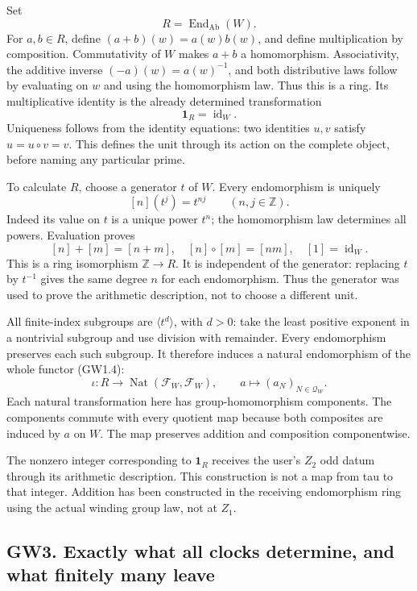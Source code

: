 Set \[
R=\operatorname{End}_{\mathrm{Ab}}(W).
\] For \(a,b\in R\), define \((a+b)(w)=a(w)b(w)\), and define
multiplication by composition. Commutativity of \(W\) makes \(a+b\) a
homomorphism. Associativity, the additive inverse \((-a)(w)=a(w)^{-1}\),
and both distributive laws follow by evaluating on \(w\) and using the
homomorphism law. Thus this is a ring. Its multiplicative identity is
the already determined transformation \[
\mathbf 1_R=\operatorname{id}_W.
\tag{GW2.1}
\] Uniqueness follows from the identity equations: two identities
\(u,v\) satisfy \(u=u\circ v=v\). This defines the unit through its
action on the complete object, before naming any particular prime.

To calculate \(R\), choose a generator \(t\) of \(W\). Every
endomorphism is uniquely \[
[n](t^j)=t^{nj}\qquad(n,j\in\mathbb Z).
\] Indeed its value on \(t\) is a unique power \(t^n\); the homomorphism
law determines all powers. Evaluation proves \[
[n]+[m]=[n+m],\quad[n]\circ[m]=[nm],\quad[1]=\operatorname{id}_W.
\tag{GW2.2}
\] This is a ring isomorphism \(\mathbb Z\to R\). It is independent of
the generator: replacing \(t\) by \(t^{-1}\) gives the same degree \(n\)
for each endomorphism. Thus the generator was used to prove the
arithmetic description, not to choose a different unit.

All finite-index subgroups are \(\langle t^d\rangle\), with \(d>0\):
take the least positive exponent in a nontrivial subgroup and use
division with remainder. Every endomorphism preserves each such
subgroup. It therefore induces a natural endomorphism of the whole
functor (GW1.4): \[
\iota:R\longrightarrow\operatorname{Nat}(\mathcal F_W,\mathcal F_W),
\qquad a\longmapsto(a_N)_{N\in\mathcal Q_W}.
\tag{GW2.3}
\] Each natural transformation here has group-homomorphism components.
The components commute with every quotient map because both composites
are induced by \(a\) on \(W\). The map preserves addition and
composition componentwise.

The nonzero integer corresponding to \(\mathbf1_R\) receives the user's
\(Z_2\) odd datum through its arithmetic description. This construction
is not a map from tau to that integer. Addition has been constructed in
the receiving endomorphism ring using the actual winding group law, not
at \(Z_1\).

\subsection{GW3. Exactly what all clocks determine, and what finitely
many
leave}\label{gw20260924-gw3.-exactly-what-all-clocks-determine-and-what-finitely-many-leave}

